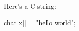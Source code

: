 Here's a C-string:



\begin{consolethree}[escapeinside=||]

char x[] = "hello world";

\end{consolethree}


